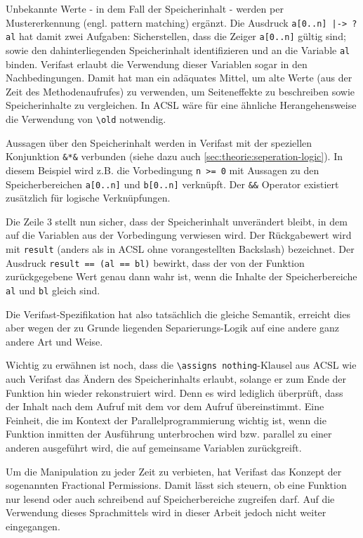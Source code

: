 Unbekannte Werte - in dem Fall der Speicherinhalt - werden per Mustererkennung (engl. pattern matching) ergänzt. 
Die Ausdruck \lstinline{a[0..n] |-> ?al} hat damit zwei Aufgaben: Sicherstellen, dass die Zeiger \lstinline{a[0..n]}
gültig sind; sowie den dahinterliegenden Speicherinhalt identifizieren und an die Variable \lstinline{al}
binden. Verifast erlaubt die Verwendung dieser Variablen sogar in den Nachbedingungen. Damit hat man ein 
adäquates Mittel, um alte Werte (aus der Zeit des Methodenaufrufes) zu verwenden, um Seiteneffekte zu
beschreiben sowie Speicherinhalte zu vergleichen. In ACSL wäre für eine ähnliche Herangehensweise
die Verwendung von \lstinline{\old} notwendig.

Aussagen über den Speicherinhalt werden in Verifast mit der speziellen Konjunktion \lstinline{&*&} 
verbunden (siehe dazu auch \ref{sec:theorie:seperation-logic}). In diesem Beispiel wird z.B. die Vorbedingung \lstinline{n >= 0} mit Aussagen zu den 
Speicherbereichen \lstinline{a[0..n]} und \lstinline{b[0..n]} verknüpft. Der \lstinline{&&} Operator 
existiert zusätzlich für logische Verknüpfungen.

Die Zeile 3 stellt nun sicher, dass der Speicherinhalt unverändert bleibt, in dem auf die Variablen aus 
der Vorbedingung verwiesen wird. Der Rückgabewert wird mit \lstinline{result} (anders als in ACSL ohne 
vorangestellten Backslash) bezeichnet. Der Ausdruck \lstinline{result == (al == bl)} 
bewirkt, dass der von der Funktion zurückgegebene Wert genau dann wahr ist, wenn die Inhalte der 
Speicherbereiche \lstinline{al} und \lstinline{bl} gleich sind.

Die Verifast-Spezifikation hat also tatsächlich die gleiche Semantik, erreicht dies aber wegen der 
zu Grunde liegenden Separierungs-Logik auf eine andere ganz andere Art und Weise.

Wichtig zu erwähnen ist noch, dass die \lstinline{\assigns nothing}-Klausel aus ACSL wie auch Verifast 
das Ändern des Speicherinhalts erlaubt, solange er zum Ende der Funktion hin wieder rekonstruiert wird.
Denn es wird lediglich überprüft, dass der Inhalt nach dem Aufruf mit dem vor
dem Aufruf übereinstimmt. Eine Feinheit, die im Kontext der Parallelprogrammierung wichtig ist, wenn
die Funktion inmitten der Ausführung unterbrochen wird bzw. parallel zu einer anderen ausgeführt wird,
die auf gemeinsame Variablen zurückgreift.

Um die Manipulation zu jeder Zeit zu verbieten, hat Verifast das Konzept der sogenannten Fractional Permissions.
Damit lässt sich steuern, ob eine Funktion nur lesend oder auch schreibend auf Speicherbereiche zugreifen darf.
Auf die Verwendung dieses Sprachmittels wird in dieser Arbeit jedoch nicht weiter eingegangen.


